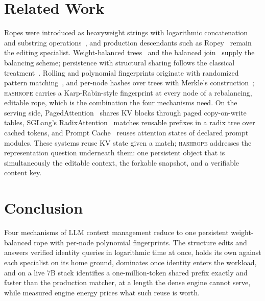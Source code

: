 \documentclass[10pt,conference]{IEEEtran}
\newcommand{\hr}{\textsc{hashrope}}
\begin{document}
\section{Related Work}\label{sec:related}

Ropes were introduced as heavyweight strings with logarithmic
concatenation and substring operations~\cite{boehm1995ropes}, and
production descendants such as Ropey~\cite{ropey} remain the editing
specialist. Weight-balanced trees~\cite{nievergelt1973bounded} and the
balanced join~\cite{adams1993efficient} supply the balancing scheme;
persistence with structural sharing follows the classical
treatment~\cite{driscoll1989persistent}. Rolling and polynomial
fingerprints originate with randomized pattern
matching~\cite{karp1987efficient}, and per-node hashes over trees with
Merkle's construction~\cite{merkle1987digital}; \hr{} carries a
Karp-Rabin-style fingerprint at every node of a rebalancing, editable
rope, which is the combination the four mechanisms need. On the
serving side, PagedAttention~\cite{kwon2023pagedattention} shares KV
blocks through paged copy-on-write tables, SGLang's
RadixAttention~\cite{zheng2024sglang} matches reusable prefixes in a
radix tree over cached tokens, and Prompt
Cache~\cite{gim2024promptcache} reuses attention states of declared
prompt modules. These systems reuse KV state given a match; \hr{}
addresses the representation question underneath them: one persistent
object that is simultaneously the editable context, the forkable
snapshot, and a verifiable content key.

\section{Conclusion}\label{sec:conclusion}

Four mechanisms of LLM context management reduce to one persistent
weight-balanced rope with per-node polynomial fingerprints. The
structure edits and answers verified identity queries in logarithmic
time at once, holds its own against each specialist on its home ground,
dominates once identity enters the workload, and on a live 7B stack
identifies a one-million-token shared prefix exactly and faster than
the production matcher, at a length the dense engine cannot serve,
while measured engine energy prices what such reuse is worth.
\end{document}
